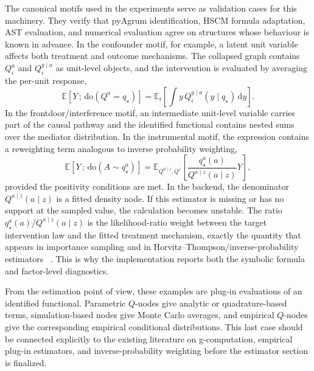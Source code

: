\documentclass[12pt]{article}
\newcommand{\E}[1]{\mathbb{E}\left[ #1 \right]}
\newcommand{\EE}[2]{\mathbb{E}_{#1}\left[ #2 \right]}
\newcommand{\rmdo}{\mathrm{do}}
\newcommand{\s}{\, ; \,}
\newcommand{\di}{\mathrm{d}}
\begin{document}
The canonical motifs used in the experiments serve as validation cases
for this machinery. They verify that pyAgrum identification, HSCM
formula adaptation, AST evaluation, and numerical evaluation agree on
structures whose behaviour is known in advance. In the confounder motif,
for example, a latent unit variable affects both treatment and outcome
mechanisms. The collapsed graph contains $Q^a_i$ and $Q^{y\mid a}_i$ as
unit-level objects, and the intervention is evaluated by averaging the
per-unit response,
\begin{equation}
  \E{Y \s \rmdo(Q^a=q_\star)}
  =
  \EE{i}{\int y\,Q^{y\mid a}_i(y\mid q_\star)\,\di y}.
  \label{eq:software_confounder_response}
\end{equation}
In the frontdoor/interference motif, an intermediate unit-level variable
carries part of the causal pathway and the identified functional
contains nested sums over the mediator distribution. In the instrumental
motif, the expression contains a reweighting term analogous to inverse
probability weighting,
\begin{equation}
  \E{Y \s \rmdo(A \sim q^a_\star)}
  =
  \EE{Q^{a\mid z},Q^z}{
    \frac{q^a_\star(a)}{Q^{a\mid z}(a\mid z)}Y
  },
  \label{eq:software_ipw}
\end{equation}
provided the positivity conditions are met. In the backend, the
denominator $Q^{a\mid z}(a\mid z)$ is a fitted density node. If this
estimator is missing or has no support at the sampled value, the
calculation becomes unstable. The ratio $q^a_\star(a) /
Q^{a\mid z}(a\mid z)$ is the likelihood-ratio weight between the target
intervention law and the fitted treatment mechanism, exactly the
quantity that appears in importance sampling and in
Horvitz--Thompson/inverse-probability estimators
~\citep{Rubinstein2016-mc,Horvitz1952-jasa,Robins2000-epi}. This is
why the implementation reports both the symbolic formula and
factor-level diagnostics.

From the estimation point of view, these examples are plug-in
evaluations of an identified functional. Parametric $Q$-nodes give
analytic or quadrature-based terms, simulation-based nodes give Monte
Carlo averages, and empirical $Q$-nodes give the corresponding empirical
conditional distributions. This last case should be connected explicitly
to the existing literature on g-computation, empirical plug-in
estimators, and inverse-probability weighting before the estimator
section is finalized.
\end{document}

